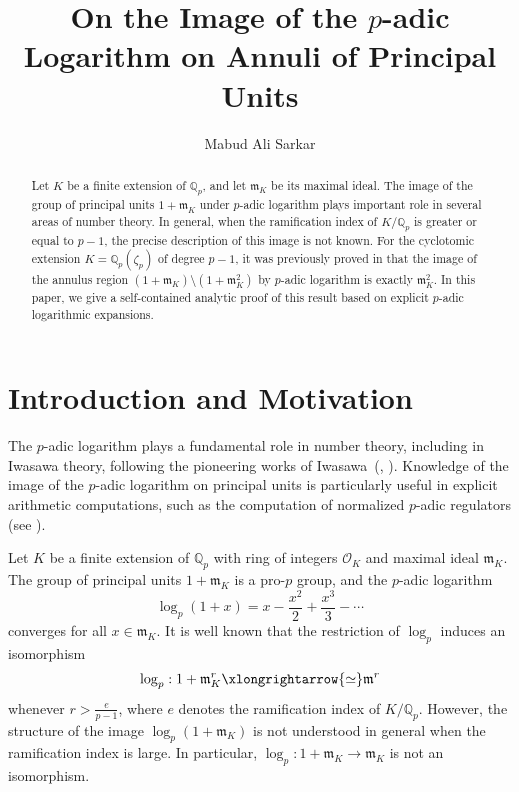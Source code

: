 \documentclass[12pt,reqno]{amsart}
\title{On the Image of the $p$-adic Logarithm on Annuli of Principal Units}
\author{Mabud Ali Sarkar}
\date{}
\numberwithin{figure}{section}
\theoremstyle{plain}
\theoremstyle{definition}
\numberwithin{equation}{section}
\begin{document}
\maketitle

\begin{abstract}
Let $K$ be a finite extension of $\mathbb{Q}_p$, and let $\mathfrak{m}_K$ be its maximal ideal. 
	 The image of the group of principal units $1+\mathfrak{m}_K$ under $p$-adic logarithm plays important role in several areas of number theory. In general, when the ramification index of $K/\mathbb{Q}_p$ is greater or equal to $p-1$, the precise description of this image is not known. For the cyclotomic extension $K=\mathbb{Q}_p(\zeta_p)$ of degree $p-1$, it was previously proved in \cite{MAS} that the image of the annulus region $(1+\mathfrak{m}_K) \setminus (1+\mathfrak{m}_K^2)$ by $p$-adic logarithm is exactly $\mathfrak{m}_K^2$.
     In this paper, we give a self-contained analytic proof  of this result based on explicit $p$-adic logarithmic expansions.
\end{abstract}
\maketitle
\section{Introduction and Motivation}\label{s1}
The $p$-adic logarithm plays a fundamental role in number theory, including in Iwasawa theory, following the pioneering works of Iwasawa~(\cite{KI1}, \cite{KI}). Knowledge of the image of the 
$p$-adic logarithm on principal units is particularly useful in explicit arithmetic computations, such as the computation of normalized $p$-adic regulators (see \cite[Theorem~2.22]{MAS}). 


Let $K$ be a finite extension of $\mathbb{Q}_p$ with ring of integers $\mathcal{O}_K$ and maximal ideal $\mathfrak{m}_K$. The group of principal units $1+\mathfrak{m}_K$ is a pro-$p$ group, and the $p$-adic logarithm 
\[\log_p(1+x)=x-\frac{x^2}{2}+\frac{x^3}{3}-\cdots\]
converges for all $x \in \mathfrak{m}_K$. It is well known that the restriction of $\log_p$ induces an isomorphism
\begin{align} \label{eq1}
    \log_p: 1+\mathfrak{m}_K^r \xlongrightarrow{\simeq} \mathfrak{m}^r
\end{align}
whenever $r>\frac{e}{p-1}$, where $e$ denotes the ramification index of $K/\mathbb{Q}_p$. However, the structure of the image $\log_p(1+\mathfrak{m}_K)$ is not understood in general when the ramification index is large. In particular, $\log_p: 1+\mathfrak{m}_K \to \mathfrak{m}_K$ is not an isomorphism. 
\end{document}
